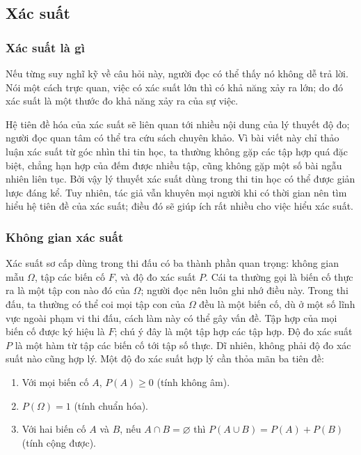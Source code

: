 \documentclass[11pt]{article}
\begin{document}
\subsection{Xác suất}

\subsubsection{Xác suất là gì}

Nếu từng suy nghĩ kỹ về câu hỏi này, người đọc có thể thấy nó không dễ trả
lời. Nói một cách trực quan, việc có xác suất lớn thì có khả năng xảy ra lớn;
do đó xác suất là một thước đo khả năng xảy ra của sự việc.

Hệ tiên đề hóa của xác suất sẽ liên quan tới nhiều nội dung của lý thuyết độ
đo; người đọc quan tâm có thể tra cứu sách chuyên khảo. Vì bài viết này chỉ
thảo luận xác suất từ góc nhìn thi tin học, ta thường không gặp các tập hợp
quá đặc biệt, chẳng hạn hợp của đếm được nhiều tập, cũng không gặp một số bài
ngẫu nhiên liên tục. Bởi vậy lý thuyết xác suất dùng trong thi tin học có thể
được giản lược đáng kể. Tuy nhiên, tác giả vẫn khuyên mọi người khi có thời
gian nên tìm hiểu hệ tiên đề của xác suất; điều đó sẽ giúp ích rất nhiều cho
việc hiểu xác suất.

\subsubsection{Không gian xác suất}

Xác suất sơ cấp dùng trong thi đấu có ba thành phần quan trọng: không gian
mẫu \(\Omega\), tập các biến cố \(F\), và độ đo xác suất \(P\). Cái ta thường
gọi là biến cố thực ra là một tập con nào đó của \(\Omega\); người đọc nên
luôn ghi nhớ điều này. Trong thi đấu, ta thường có thể coi mọi tập con của
\(\Omega\) đều là một biến cố, dù ở một số lĩnh vực ngoài phạm vi thi đấu,
cách làm này có thể gây vấn đề. Tập hợp của mọi biến cố được ký hiệu là
\(F\); chú ý đây là một tập hợp các tập hợp. Độ đo xác suất \(P\) là một hàm
từ tập các biến cố tới tập số thực. Dĩ nhiên, không phải độ đo xác suất nào
cũng hợp lý. Một độ đo xác suất hợp lý cần thỏa mãn ba tiên đề:
\begin{enumerate}
  \item Với mọi biến cố \(A\), \(P(A)\ge 0\) (tính không âm).
  \item \(P(\Omega)=1\) (tính chuẩn hóa).
  \item Với hai biến cố \(A\) và \(B\), nếu \(A\cap B=\varnothing\) thì
  \(P(A\cup B)=P(A)+P(B)\) (tính cộng được).
\end{enumerate}
\end{document}
